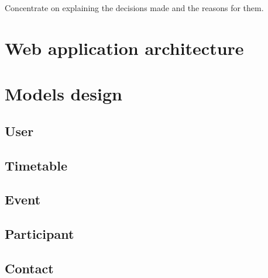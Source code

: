 Concentrate on explaining the decisions made and the reasons for them.
\section{Web application architecture}

\section{Models design}
\subsection{User}
\subsection{Timetable}
\subsection{Event}
\subsection{Participant}
\subsection{Contact}
